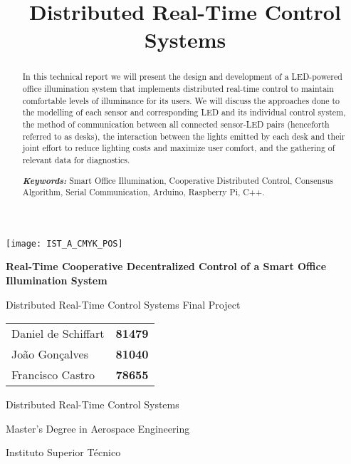 \documentclass[english,fira]{ist-report}
\title{Distributed Real-Time Control Systems}
\begin{document}
\begin{titlepage}

\begin{center}
	\vspace*{0.1\textheight}
	\texttt{[image: IST\_A\_CMYK\_POS]}
	
	\vspace*{0.1\textheight}
	{\huge\bfseries Real-Time Cooperative Decentralized Control of a Smart Office Illumination System}
	
	\vspace*{0.03\textheight}
	{\Large Distributed Real-Time Control Systems Final Project}
	
	\vspace*{43.5mm}
	{\Large \begin{tabular}{l r} Daniel de Schiffart & \textbf{81479} \\ João Gonçalves & \textbf{81040} \\ Francisco Castro & \textbf{78655}\end{tabular}}
	
	\vspace{\fill}
	{\large Distributed Real-Time Control Systems}
	
	\vspace*{0.01\textheight}
	{\Large Master's Degree in Aerospace Engineering}
	
	\vspace*{0.01\textheight}
	{\large Instituto Superior Técnico}
\end{center}

\end{titlepage}
\setcounter{page}{1}

\begin{abstract}
	In this technical report we will present the design and development of a LED-powered office illumination system that implements distributed real-time control to maintain comfortable levels of illuminance for its users. We will discuss the approaches done to the modelling of each sensor and corresponding LED and its individual control system, the method of communication between all connected sensor-LED pairs (henceforth referred to as desks), the interaction between the lights emitted by each desk and their joint effort to reduce lighting costs and maximize user comfort, and the gathering of relevant data for diagnostics.
	\newline
	
	\textit{\textbf{Keywords:}} Smart Office Illumination, Cooperative Distributed Control, Consensus Algorithm, Serial Communication, Arduino, Raspberry Pi, C++.
\end{abstract}
\end{document}
